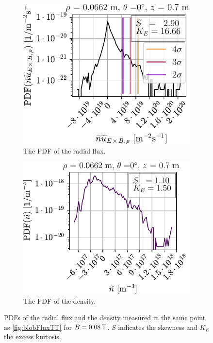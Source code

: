 \begin{figure}[htbp]
    \centering
    \begin{subfigure}[h]{0.45\textwidth}
        \center
        \includegraphics{fig/results/blobs/blobFluxPDF_B0_008Tweak}
        \caption{The PDF of the radial flux.}
        \label{fig:blobFluxPDF}
    \end{subfigure}
    \hfill
    \begin{subfigure}[h]{0.45\textwidth}
        \center
        \includegraphics{fig/results/blobs/blobDensPDF_B0_008Tweak}
        \caption{The PDF of the density.}
        \label{fig:blobDensPDF}
    \end{subfigure}%
    \caption{PDFs of the radial flux and the density measured in the same point as \cref{fig:blobFluxTT} for $B=0.08\, \text{T}$.
            $S$ indicates the skewness and $K_E$ the excess kurtosis.}
\end{figure}
%

